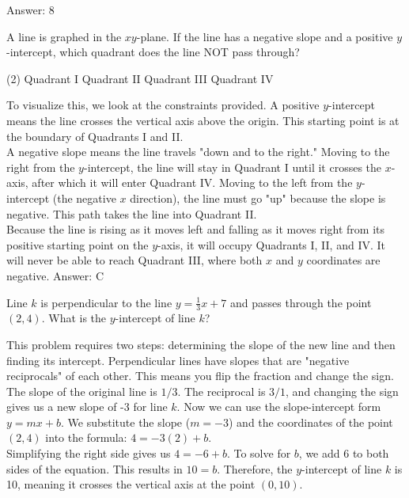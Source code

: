 \documentclass[11pt,paper=a4,answers]{exam}
\begin{document}
\begin{questions}
\begin{solution}
\vspace{15pt}
Answer: \colorbox{yellow!100}{8}
\end{solution}

\question
A line is graphed in the $xy$-plane. If the line has a negative slope and a positive $y$-intercept, which quadrant does the line NOT pass through?
\begin{tasks}(2)
    \task Quadrant I
    \task Quadrant II
    \task Quadrant III
    \task Quadrant IV
\end{tasks}

\begin{solution}

To visualize this, we look at the constraints provided. A positive $y$-intercept means the line crosses the vertical axis above the origin. This starting point is at the boundary of Quadrants I and II. 
\\[10pt]
A negative slope means the line travels "down and to the right." Moving to the right from the $y$-intercept, the line will stay in Quadrant I until it crosses the $x$-axis, after which it will enter Quadrant IV. Moving to the left from the $y$-intercept (the negative $x$ direction), the line must go "up" because the slope is negative. This path takes the line into Quadrant II.
\\[10pt]
Because the line is rising as it moves left and falling as it moves right from its positive starting point on the $y$-axis, it will occupy Quadrants I, II, and IV. It will never be able to reach Quadrant III, where both $x$ and $y$ coordinates are negative.
\vspace{15pt}
Answer: \colorbox{yellow!100}{C}
\end{solution}

\question
Line $k$ is perpendicular to the line $y = \frac{1}{3}x + 7$ and passes through the point $(2, 4)$. What is the $y$-intercept of line $k$?

\begin{solution}
This problem requires two steps: determining the slope of the new line and then finding its intercept. Perpendicular lines have slopes that are "negative reciprocals" of each other. This means you flip the fraction and change the sign.
\\[10pt]
The slope of the original line is $1/3$. The reciprocal is $3/1$, and changing the sign gives us a new slope of -3 for line $k$. Now we can use the slope-intercept form $y = mx + b$. We substitute the slope ($m = -3$) and the coordinates of the point $(2, 4)$ into the formula: $4 = -3(2) + b$.
\\[10pt]
Simplifying the right side gives us $4 = -6 + b$. To solve for $b$, we add 6 to both sides of the equation. This results in $10 = b$. Therefore, the $y$-intercept of line $k$ is 10, meaning it crosses the vertical axis at the point $(0, 10)$.


\end{solution}
\end{questions}
\end{document}
